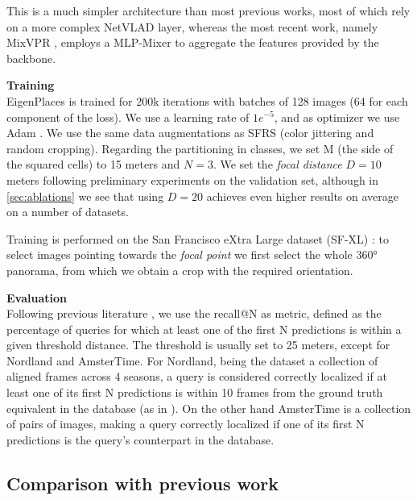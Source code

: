 \documentclass[10pt,twocolumn,letterpaper]{article}
\newcommand{\myparagraph}[1]{\vspace{4pt}\noindent\textbf{#1}}
\begin{document}
This is a much simpler architecture than most previous works, most of which \cite{Arandjelovic_2018_netvlad,Liu_2019_sare,Kim_2017_crn,Ge_2020_sfrs, Peng_2021_appsvr} rely on a more complex NetVLAD layer,
whereas the most recent work, namely MixVPR \cite{Alibey_2023_mixvpr}, employs a MLP-Mixer to aggregate the features provided by the backbone.

\myparagraph{Training} \\
EigenPlaces is trained for 200k iterations with batches of 128 images (64 for each component of the loss).
We use a learning rate of $1e^{-5}$, and as optimizer we use Adam \cite{Kingma_2014_adam}.
We use the same data augmentations as SFRS \cite{Ge_2020_sfrs} (color jittering and random cropping).
Regarding the partitioning in classes, we set M (the side of the squared cells) to 15 meters and $N=3$.
We set the \textit{focal distance} $D=10$ meters following preliminary experiments on the validation set, although in \cref{sec:ablations} we see that using $D=20$ achieves even higher results on average on a number of datasets.

Training is performed on the San Francisco eXtra Large dataset (SF-XL) \cite{Berton_2022_cosPlace}:
to select images pointing towards the \emph{focal point} we first select the whole 360° panorama, from which we obtain a crop with the required orientation.


\myparagraph{Evaluation} \\
Following previous literature \cite{Arandjelovic_2018_netvlad, Kim_2017_crn, Alibey_2022_gsvcities, Alibey_2023_mixvpr, Berton_2022_cosPlace, Masone_2021_survey, Ibrahimi_2021_insideout_vpr, Zaffar_2021_vprbench, Wang_2022_TransVPR,Zhang_2021_gated_netvlad}, we use the recall@N as metric, defined as the percentage of queries for which at least one of the first N predictions is within a given threshold distance.
The threshold is usually set to 25 meters, except for Nordland and AmsterTime.
For Nordland, being the dataset a collection of aligned frames across 4 seasons, a query is considered correctly localized if at least one of its first N predictions is within 10 frames from the ground truth equivalent in the database (as in \cite{Hausler_2019, Hausler_2021_patch_netvlad}).
On the other hand AmsterTime \cite{Yildiz_2022_AmsterTime} is a collection of pairs of images, making a query correctly localized if one of its first N predictions is the query's counterpart in the database.



\subsection{Comparison with previous work}
\end{document}
